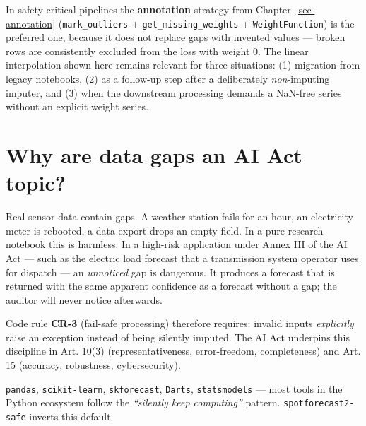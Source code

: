 \documentclass[
  english,
  letterpaper,
]{scrbook}
\begin{document}
\begin{tcolorbox}[enhanced jigsaw, arc=.35mm, bottomrule=.15mm, bottomtitle=1mm, breakable, colback=white, colbacktitle=quarto-callout-important-color!10!white, colframe=quarto-callout-important-color-frame, coltitle=black, left=2mm, leftrule=.75mm, opacityback=0, opacitybacktitle=0.6, rightrule=.15mm, title=\textcolor{quarto-callout-important-color}{\faExclamation}\hspace{0.5em}{Preferred strategy: annotation}, titlerule=0mm, toprule=.15mm, toptitle=1mm]

In safety-critical pipelines the \textbf{annotation} strategy from
Chapter~\ref{sec-annotation} (\texttt{mark\_outliers} +
\texttt{get\_missing\_weights} + \texttt{WeightFunction}) is the
preferred one, because it does not replace gaps with invented values ---
broken rows are consistently excluded from the loss with weight 0. The
linear interpolation shown here remains relevant for three situations:
(1) migration from legacy notebooks, (2) as a follow-up step after a
deliberately \emph{non}-imputing imputer, and (3) when the downstream
processing demands a NaN-free series without an explicit weight series.

\end{tcolorbox}

\section{Why are data gaps an AI Act
topic?}\label{why-are-data-gaps-an-ai-act-topic}

Real sensor data contain gaps. A weather station fails for an hour, an
electricity meter is rebooted, a data export drops an empty field. In a
pure research notebook this is harmless. In a high-risk application
under Annex III of the AI Act --- such as the electric load forecast
that a transmission system operator uses for dispatch --- an
\emph{unnoticed} gap is dangerous. It produces a forecast that is
returned with the same apparent confidence as a forecast without a gap;
the auditor will never notice afterwards.

Code rule \textbf{CR-3} (fail-safe processing) therefore requires:
invalid inputs \emph{explicitly} raise an exception instead of being
silently imputed. The AI Act underpins this discipline in Art. 10(3)
(representativeness, error-freedom, completeness) and Art. 15 (accuracy,
robustness, cybersecurity).

\texttt{pandas}, \texttt{scikit-learn}, \texttt{skforecast},
\texttt{Darts}, \texttt{statsmodels} --- most tools in the Python
ecosystem follow the \emph{``silently keep computing''} pattern.
\texttt{spotforecast2-safe} inverts this default.
\end{document}
